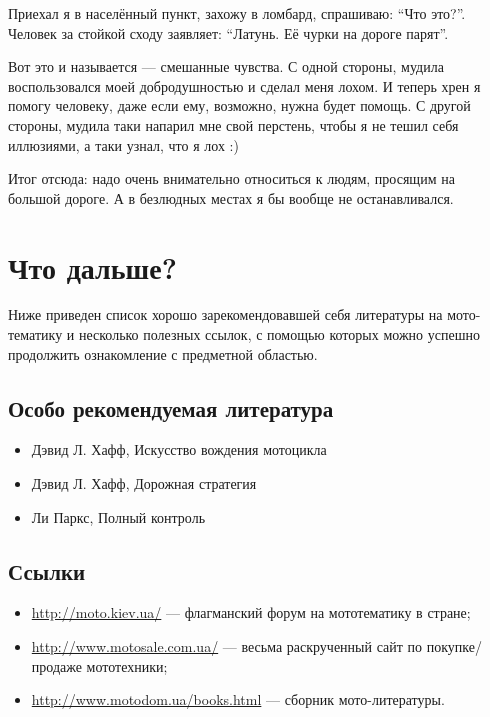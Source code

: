 \documentclass[12pt,a4paper]{article}
\begin{document}
Приехал я в населённый пункт, захожу в ломбард, спрашиваю: ``Что это?''.
Человек за стойкой сходу заявляет: ``Латунь. Её чурки на дороге парят''.

Вот это и называется --- смешанные чувства. С одной стороны, мудила
воспользовался моей добродушностью и сделал меня лохом. И теперь хрен
я помогу человеку, даже если ему, возможно, нужна будет помощь. С другой
стороны, мудила таки напарил мне свой перстень, чтобы я не тешил себя
иллюзиями, а таки узнал, что я лох :)

Итог отсюда: надо очень внимательно относиться к людям, просящим на
большой дороге. А в безлюдных местах я бы вообще не останавливался.

\clearpage

\section{Что дальше?}

Ниже приведен список хорошо зарекомендовавшей себя литературы на
мото-тематику и несколько полезных ссылок, с помощью которых можно
успешно продолжить ознакомление с предметной областью.

\subsection{Особо рекомендуемая литература}

\begin{itemize}
\item Дэвид Л. Хафф, Искусство вождения мотоцикла
\item Дэвид Л. Хафф, Дорожная стратегия
\item Ли Паркс, Полный контроль
\end{itemize}

\subsection{Ссылки}

\begin{itemize}
\item \url{http://moto.kiev.ua/} --- флагманский форум на мототематику в стране;
\item \url{http://www.motosale.com.ua/} --- весьма раскрученный сайт по покупке/продаже мототехники;
\item \url{http://www.motodom.ua/books.html} --- сборник мото-литературы.
\end{itemize}
\end{document}
